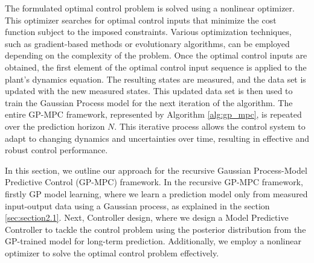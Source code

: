  The formulated optimal control problem is solved using a nonlinear optimizer. This optimizer searches for optimal control inputs that minimize the cost function subject to the imposed constraints. Various optimization techniques, such as gradient-based methods or evolutionary algorithms, can be employed depending on the complexity of the problem. Once the optimal control inputs are obtained, the first element of the optimal control input sequence is applied to the plant's dynamics equation. The resulting states are measured, and the data set is updated with the new measured states. This updated data set is then used to train the Gaussian Process model for the next iteration of the algorithm. The entire GP-MPC framework, represented by Algorithm \ref{alg:gp_mpc}, is repeated over the prediction horizon $N$. This iterative process allows the control system to adapt to changing dynamics and uncertainties over time, resulting in effective and robust control performance.
 
 In this section, we outline our approach for the recursive Gaussian Process-Model Predictive Control (GP-MPC) framework. In the recursive GP-MPC framework, firstly GP model learning, where we learn a prediction model only from measured input-output data using a Gaussian process, as explained in the section \ref{sec:section2.1}. Next, Controller design, where we design a Model Predictive Controller to tackle the control problem using the posterior distribution from the GP-trained model for long-term prediction. Additionally, we employ a nonlinear optimizer to solve the optimal control problem effectively.




